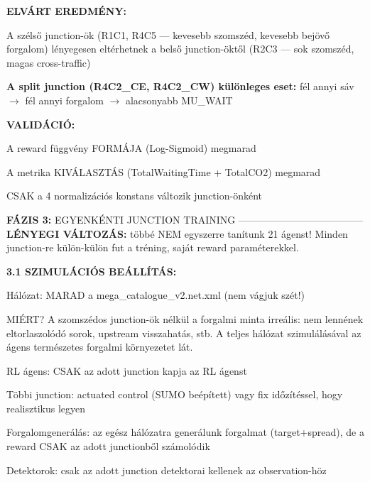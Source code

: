 \documentclass[11pt,a4paper]{article}
\begin{document}
\textbf{ELVÁRT EREDMÉNY:}
\par\noindent\hspace*{1em}\textbullet{} A szélső junction-ök (R1C1, R4C5 — kevesebb szomszéd,
kevesebb bejövő forgalom) lényegesen eltérhetnek a belső
junction-öktől (R2C3 — sok szomszéd, magas cross-traffic)
\par\noindent\hspace*{1em}\textbullet{} \textbf{A split junction (R4C2\_CE, R4C2\_CW) különleges eset:}
fél annyi sáv $\rightarrow$ fél annyi forgalom $\rightarrow$ alacsonyabb MU\_WAIT

\textbf{VALIDÁCIÓ:}
\par\noindent\hspace*{1em}\textbullet{} A reward függvény FORMÁJA (Log-Sigmoid) megmarad
\par\noindent\hspace*{1em}\textbullet{} A metrika KIVÁLASZTÁS (TotalWaitingTime + TotalCO2) megmarad
\par\noindent\hspace*{1em}\textbullet{} CSAK a 4 normalizációs konstans változik junction-önként

\textbf{FÁZIS 3:} EGYENKÉNTI JUNCTION TRAINING
--------------------------------------
\textbf{LÉNYEGI VÁLTOZÁS:} többé NEM egyszerre tanítunk 21 ágenst!
Minden junction-re külön-külön fut a tréning, saját reward
paraméterekkel.

\textbf{3.1 SZIMULÁCIÓS BEÁLLÍTÁS:}
\par\noindent\hspace*{1em}\textbullet{} Hálózat: MARAD a mega\_catalogue\_v2.net.xml (nem vágjuk szét!)
\par\noindent\hspace*{1em}\textbullet{} MIÉRT? A szomszédos junction-ök nélkül a forgalmi minta
irreális: nem lennének eltorlaszolódó sorok, upstream
visszahatás, stb. A teljes hálózat szimulálásával az ágens
természetes forgalmi környezetet lát.
\par\noindent\hspace*{1em}\textbullet{} RL ágens: CSAK az adott junction kapja az RL ágenst
\par\noindent\hspace*{1em}\textbullet{} Többi junction: actuated control (SUMO beépített) vagy
fix időzítéssel, hogy realisztikus legyen
\par\noindent\hspace*{1em}\textbullet{} Forgalomgenerálás: az egész hálózatra generálunk forgalmat
(target+spread), de a reward CSAK az adott junctionből számolódik
\par\noindent\hspace*{1em}\textbullet{} Detektorok: csak az adott junction detektorai kellenek az
observation-höz
\end{document}
